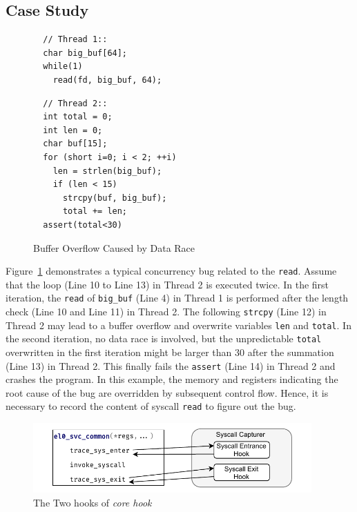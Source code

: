 \subsection{Case Study}

\begin{figure}
    \begin{minipage}[t]{0.46\textwidth}
      \begin{lstlisting}
  // Thread 1::
  char big_buf[64];
  while(1)
    read(fd, big_buf, 64);
      \end{lstlisting}    
    \end{minipage}
    \begin{minipage}[t]{0.46\textwidth}
      \lstset{firstnumber=last}
      \begin{lstlisting}
  // Thread 2::
  int total = 0;
  int len = 0;
  char buf[15];
  for (short i=0; i < 2; ++i)
    len = strlen(big_buf);
    if (len < 15)
      strcpy(buf, big_buf);
      total += len;
  assert(total<30)
    \end{lstlisting}    
    \end{minipage}
  
  
    \caption{Buffer Overflow Caused by Data Race}
    \label{fig:data-race}
\end{figure}

Figure~\ref{fig:data-race} demonstrates a typical concurrency
bug related to the 
\syscall{} \texttt{read}. Assume that the loop (Line 10 to Line 13) in Thread 2
is executed twice. In the first iteration, the \texttt{read} of 
\texttt{big\_buf} (Line 4) in Thread 1 is performed after the length 
check (Line 10 and Line 11) in Thread 2. The following \texttt{strcpy} (Line 12) in 
Thread 2 may lead to a buffer overflow and overwrite variables \texttt{len} and 
\texttt{total}. In the second iteration, no data race is involved, but the 
unpredictable \texttt{total} overwritten in the first iteration might be larger
than 30 after the summation (Line 13) in Thread 2. This finally fails the
\texttt{assert} (Line 14) in Thread 2 and crashes the program.
In this example, the memory and registers indicating the root cause of
the bug are overridden by subsequent control flow. 
Hence, it is necessary to record the content of syscall \texttt{read} to figure out the bug.


\begin{figure}
    \centering
    \includegraphics[width=0.95\textwidth]{figures/syscall_capturer.pdf}
    \caption{The Two hooks of \textit{core hook}}
    \label{fig:core-hook-desgin}
\end{figure}


